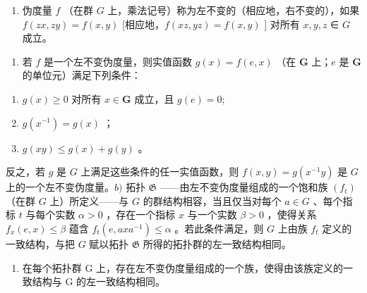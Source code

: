 \ExerciseSection

\begin{enumerate}
\def\labelenumi{\arabic{enumi})}
\tightlist
\item
  伪度量 \(f\) （在群 \(G\) 上，乘法记号）称为左不变的（相应地，右不变的），如果 \(f(zx, zy) = f(x, y)\) {[}相应地，\(f(xz, yz) = f(x, y)\) {]} 对所有 \(x, y, z\) ∈ \(G\) 成立。
\end{enumerate}

\begin{enumerate}
\def\labelenumi{\alph{enumi})}
\tightlist
\item
  若 \(f\) 是一个左不变伪度量，则实值函数 \(g(x) = f(e, x)\) （在 \(\mathbf{G}\) 上；\(e\) 是 \(\mathbf{G}\) 的单位元）满足下列条件：
\end{enumerate}

\begin{enumerate}
\def\labelenumi{(\roman{enumi})}
\item
  \(g(x)\geqslant \mathrm{0}\) 对所有 \(x\in \mathbf{G}\) 成立，且 \(g(e) = \mathrm{0};\)
\item
  \(g(x^{-1}) = g(x)\) ；
\item
  \(g(xy) \leqslant g(x) + g(y)\) 。
\end{enumerate}

反之，若 \(g\) 是 \(G\) 上满足这些条件的任一实值函数，则 \(f(x, y) = g(x^{-1}y)\) 是 \(G\) 上的一个左不变伪度量。\(b)\) 拓扑 \(\mathfrak{G}\) ——由左不变伪度量组成的一个饱和族 \((f_t)\) （在群 \(G\) 上）所定义——与 \(G\) 的群结构相容，当且仅当对每个 \(a \in G\) 、每个指标 \(t\) 与每个实数 \(\alpha > 0\) ，存在一个指标 \(x\) 与一个实数 \(\beta > 0\) ，使得关系 \(f_x(e, x) \leqslant \beta\) 蕴含 \(f_t(e, axa^{-1}) \leqslant \alpha\) 。若此条件满足，则 \(G\) 上由族 \(f_t\) 定义的一致结构，与把 \(G\) 赋以拓扑 \(\mathfrak{G}\) 所得的拓扑群的左一致结构相同。

\begin{enumerate}
\def\labelenumi{\alph{enumi})}
\setcounter{enumi}{2}
\tightlist
\item
  在每个拓扑群 G 上，存在左不变伪度量组成的一个族，使得由该族定义的一致结构与 G 的左一致结构相同。
\end{enumerate}

